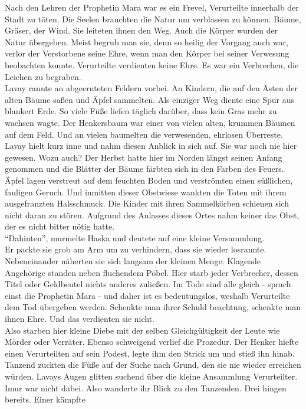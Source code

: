 Nach den Lehren der Prophetin Mara war es ein Frevel, Verurteilte innerhalb der Stadt zu töten. Die 
Seelen brauchten die Natur um verblassen zu können. Bäume, Gräser, der Wind. Sie leiteten ihnen den 
Weg. Auch die Körper wurden der Natur übergeben. Meist begrub man sie, denn so heilig der Vorgang 
auch war, verlor der Verstorbene seine Ehre, wenn man den Körper bei seiner Verwesung beobachten 
konnte. Verurteilte verdienten keine Ehre. Es war ein Verbrechen, die Leichen zu begraben.\\
Lavay rannte an abgeernteten Feldern vorbei. An Kindern, die auf den Ästen der alten Bäume saßen 
und Äpfel sammelten. Als einziger Weg diente eine Spur aus blankert Erde. So viele Füße liefen 
täglich darüber, dass kein Gras mehr zu wachsen wagte. Der Henkersbaum war einer von vielen alten, 
krummen Bäumen auf dem Feld. Und an vielen baumelten die verwesenden, ehrlosen Überreste. Lavay 
hielt kurz inne und nahm diesen Anblick in sich auf. Sie war noch nie hier gewesen. Wozu auch? 
Der Herbst hatte hier im Norden längst seinen Anfang genommen und die Blätter der Bäume färbten 
sich in den Farben des Feuers. Äpfel lagen verstreut auf dem feuchten Boden und verströmten einen 
süßlichen, fauligen Geruch. Und inmitten dieser Obstwiese wankten die Toten mit ihrem ausgefranzten 
Halsschmuck. Die Kinder mit ihren Sammelkörben schienen sich nicht daran zu stören. Aufgrund des 
Anlasses dieses Ortes nahm keiner das Obst, der es nicht bitter nötig hatte. \\
``Dahinten'', murmelte Haska und deutete auf eine kleine Versammlung. \\
Er packte sie grob am Arm um zu verhindern, dass sie wieder losrannte. Nebeneinander näherten sie 
sich langsam der kleinen Menge. Klagende Angehörige standen neben fluchendem Pöbel. Hier starb 
jeder Verbrecher, dessen Titel oder Geldbeutel nichts anderes zuließen. Im Tode sind alle gleich - 
sprach einst die Prophetin Mara - und daher ist es bedeutungslos, weshalb Verurteilte dem Tod 
übergeben werden. Schenkte man ihrer Schuld beachtung, schenkte man ihnen Ehre. Und das verdienten 
sie nicht. \\
Also starben hier kleine Diebe mit der selben Gleichgültigkeit der Leute wie Mörder oder Verräter. 
Ebenso schweigend verlief die Prozedur. Der Henker hiefte einen Verurteilten auf sein Podest, legte 
ihm den Strick um und stieß ihn hinab. Tanzend zuckten die Füße auf der Suche nach Grund, den sie 
nie wieder erreichen würden. Lavays Augen glitten suchend über die kleine Ansammlung Verurteilter. 
Imur war nicht dabei. Also wanderte ihr Blick zu den Tanzenden. Drei hingen bereits. Einer kämpfte 
